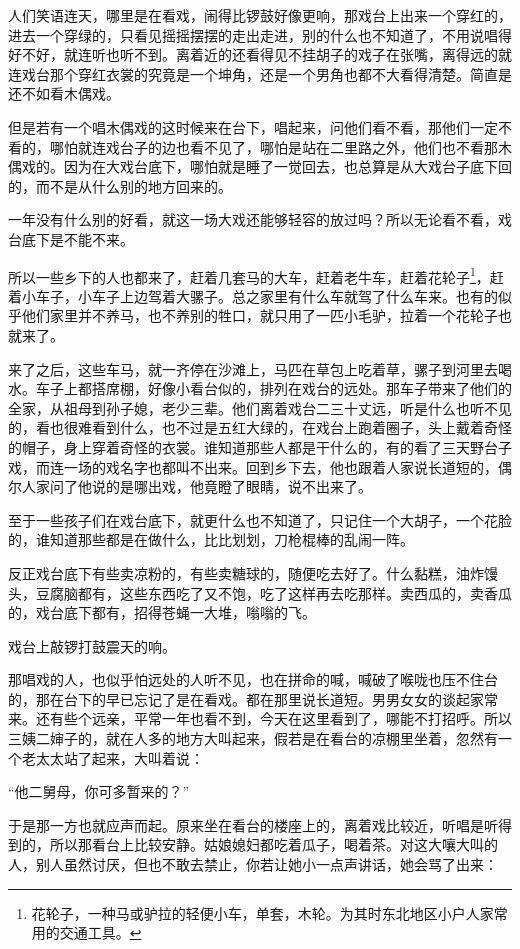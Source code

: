 \par 人们笑语连天，哪里是在看戏，闹得比锣鼓好像更响，那戏台上出来一个穿红的，进去一个穿绿的，只看见摇摇摆摆的走出走进，别的什么也不知道了，不用说唱得好不好，就连听也听不到。离着近的还看得见不挂胡子的戏子在张嘴，离得远的就连戏台那个穿红衣裳的究竟是一个坤角，还是一个男角也都不大看得清楚。简直是还不如看木偶戏。
\par 但是若有一个唱木偶戏的这时候来在台下，唱起来，问他们看不看，那他们一定不看的，哪怕就连戏台子的边也看不见了，哪怕是站在二里路之外，他们也不看那木偶戏的。因为在大戏台底下，哪怕就是睡了一觉回去，也总算是从大戏台子底下回的，而不是从什么别的地方回来的。
\par 一年没有什么别的好看，就这一场大戏还能够轻容的放过吗？所以无论看不看，戏台底下是不能不来。
\par 所以一些乡下的人也都来了，赶着几套马的大车，赶着老牛车，赶着花轮子\footnote{花轮子，一种马或驴拉的轻便小车，单套，木轮。为其时东北地区小户人家常用的交通工具。}，赶着小车子，小车子上边驾着大骡子。总之家里有什么车就驾了什么车来。也有的似乎他们家里并不养马，也不养别的牲口，就只用了一匹小毛驴，拉着一个花轮子也就来了。
\par 来了之后，这些车马，就一齐停在沙滩上，马匹在草包上吃着草，骡子到河里去喝水。车子上都搭席棚，好像小看台似的，排列在戏台的远处。那车子带来了他们的全家，从祖母到孙子媳，老少三辈。他们离着戏台二三十丈远，听是什么也听不见的，看也很难看到什么，也不过是五红大绿的，在戏台上跑着圈子，头上戴着奇怪的帽子，身上穿着奇怪的衣裳。谁知道那些人都是干什么的，有的看了三天野台子戏，而连一场的戏名字也都叫不出来。回到乡下去，他也跟着人家说长道短的，偶尔人家问了他说的是哪出戏，他竟瞪了眼睛，说不出来了。
\par 至于一些孩子们在戏台底下，就更什么也不知道了，只记住一个大胡子，一个花脸的，谁知道那些都是在做什么，比比划划，刀枪棍棒的乱闹一阵。
\par 反正戏台底下有些卖凉粉的，有些卖糖球的，随便吃去好了。什么黏糕，油炸馒头，豆腐脑都有，这些东西吃了又不饱，吃了这样再去吃那样。卖西瓜的，卖香瓜的，戏台底下都有，招得苍蝇一大堆，嗡嗡的飞。
\par 戏台上敲锣打鼓震天的响。
\par 那唱戏的人，也似乎怕远处的人听不见，也在拼命的喊，喊破了喉咙也压不住台的，那在台下的早已忘记了是在看戏。都在那里说长道短。男男女女的谈起家常来。还有些个远亲，平常一年也看不到，今天在这里看到了，哪能不打招呼。所以三姨二婶子的，就在人多的地方大叫起来，假若是在看台的凉棚里坐着，忽然有一个老太太站了起来，大叫着说：
\par “他二舅母，你可多暂来的？”
\par 于是那一方也就应声而起。原来坐在看台的楼座上的，离着戏比较近，听唱是听得到的，所以那看台上比较安静。姑娘媳妇都吃着瓜子，喝着茶。对这大嚷大叫的人，别人虽然讨厌，但也不敢去禁止，你若让她小一点声讲话，她会骂了出来：

